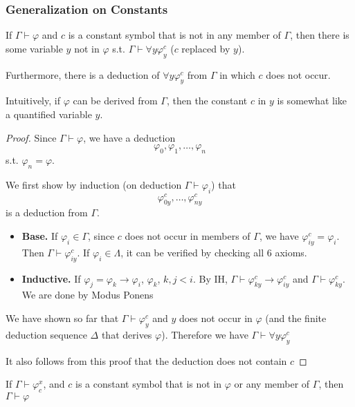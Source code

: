\subsubsection{Generalization on Constants}

\begin{theorem}
    \label{thm:GeneralizationOnConsts}
    If $\Gamma\vdash\varphi$ and $c$ is a constant symbol that is not in any member of $\Gamma$, then there is some variable $y$ not in $\varphi$ s.t. $\Gamma\vdash\forall y \varphi_y^c$ ($c$ replaced by $y$).

    Furthermore, there is a deduction of $\forall y \varphi_y^c$ from $\Gamma$ in which $c$ does not occur.
\end{theorem}

Intuitively, if $\varphi$ can be derived from $\Gamma$, then the constant $c$ in $y$ is somewhat like a quantified variable $y$.

\begin{proof}
    Since $\Gamma\vdash\varphi$, we have a deduction
    \[ \varphi_0,\varphi_1,\dots,\varphi_n \]
    s.t. $\varphi_n=\varphi$.

    We first show by induction (on deduction $\Gamma\vdash\varphi_i$) that
    \[ \varphi_{0y}^c,\dots,\varphi_{ny}^c \]
    is a deduction from $\Gamma$.
    \begin{itemize}
        \item[] \textbf{Base.} If $\varphi_i \in \Gamma$, since $c$ does not occur in members of $\Gamma$, we have $\varphi_{iy}^c = \varphi_i$. Then $\Gamma\vdash\varphi_{iy}^c$. If $\varphi_i\in\Lambda$, it can be verified by checking all 6 axioms.
        \item[] \textbf{Inductive.} If $\varphi_j = \varphi_k\to\varphi_i$, $\varphi_k$, $k,j < i$. By IH, $\Gamma\vdash\varphi_{ky}^c \to \varphi_{iy}^c$ and $\Gamma\vdash\varphi_{ky}^c$. We are done by Modus Ponens
    \end{itemize}

    We have shown so far that $\Gamma\vdash\varphi_y^c$ and $y$ does not occur in $\varphi$ (and the finite deduction sequence $\Delta$ that derives $\varphi$). Therefore we have $\Gamma\vdash\forall y \varphi_y^c$

    It also follows from this proof that the deduction does not contain $c$
\end{proof}

\begin{corollary}[Corollary 24G]
    \label{coroll:Corollary24G}
    If $\Gamma\vdash\varphi_c^x$, and $c$ is a constant symbol that is not in $\varphi$ or any member of $\Gamma$, then $\Gamma\vdash\varphi$
\end{corollary}

